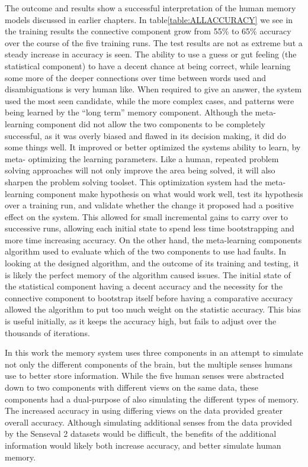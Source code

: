 The outcome and results show a successful interpretation of the human memory
models discussed in earlier chapters. In table\ref{table:ALLACCURACY} we see in
the training results the connective component grow from 55\% to 65\% accuracy
over the course of the five training runs. The test results are not as extreme
but a steady increase in accuracy is seen.  The ability to use a guess or gut
feeling (the statistical component) to have a decent chance at being correct,
while learning some more of the deeper connections over time between words used
and disambiguations is very human like.  When required to give an answer, the
system used the most seen candidate, while the more complex cases, and patterns
were being learned by the ``long term'' memory component.  Although the meta-
learning component did not allow the two components to be completely successful,
as it was overly biased and flawed in its decision making, it did do some things
well. It improved or better optimized the systems ability to learn, by meta-
optimizing the learning parameters. Like a human, repeated problem solving
approaches will not only improve the area being solved, it will also sharpen the
problem solving toolset. This optimization system had the meta-learning
component make hypothesis on what would work well, test its hypothesis over a
training run, and validate whether the change it proposed had a positive effect
on the system. This allowed for small incremental gains to carry over to
successive runs, allowing each initial state to spend less time bootstrapping
and more time increasing accuracy. On the other hand, the meta-learning
components algorithm used to evaluate which of the two components to use had
faults.  In looking at the designed algorithm, and the outcome of its training
and testing, it is likely the perfect memory of the algorithm caused issues.
The initial state of the statistical component having a decent accuracy and the
necessity for the connective component to bootstrap itself before having a
comparative accuracy allowed the algorithm to put too much weight on the
statistic accuracy.  This bias is useful initially, as it keeps the accuracy
high, but fails to adjust over the thousands of iterations.

In this work the memory system uses three components in an attempt to simulate
not only the different components of the brain, but the multiple senses humans
use to better store information. While the five human senses were abstracted
down to two components with different views on the same data, these components
had a dual-purpose of also simulating the different types of memory.  The
increased accuracy in using differing views on the data provided greater overall
accuracy. Although simulating additional senses from the data provided by the
Senseval 2 datasets would be difficult, the benefits of the additional
information would likely both increase accuracy, and better simulate human
memory.

